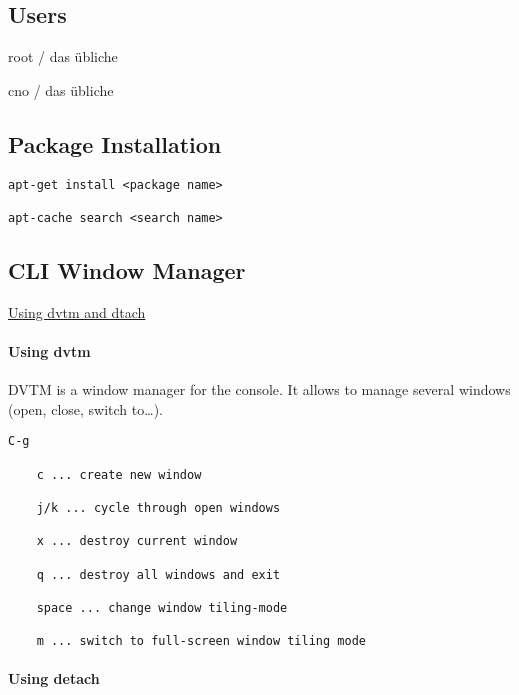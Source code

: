 

\subsection{Users}\label{users}

root / das übliche

cno / das übliche

\subsection{Package Installation}\label{package-installation}

\begin{verbatim}
apt-get install <package name>

apt-cache search <search name>
\end{verbatim}

\subsection{CLI Window Manager}\label{cli-window-manager}

\href{https://www.digitalocean.com/community/tutorials/how-to-use-dvtm-and-dtach-as-a-terminal-window-manager-on-an-ubuntu-vps}{Using
dvtm and dtach}

\paragraph{Using dvtm}\label{using-dvtm}

DVTM is a window manager for the console. It allows to manage several
windows (open, close, switch to\ldots{}).

\begin{verbatim}
C-g

    c ... create new window

    j/k ... cycle through open windows

    x ... destroy current window

    q ... destroy all windows and exit

    space ... change window tiling-mode

    m ... switch to full-screen window tiling mode
\end{verbatim}

\paragraph{Using detach}\label{using-detach}


